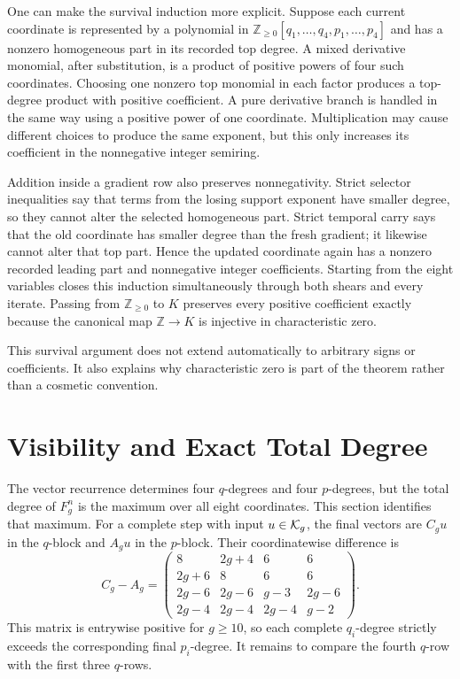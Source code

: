 \documentclass[11pt]{article}
\theoremstyle{remark}
\numberwithin{equation}{section}
\begin{document}
One can make the survival induction more explicit.  Suppose each current
coordinate is represented by a polynomial in
\(\mathbb Z_{\geq0}[q_1,\ldots,q_4,p_1,\ldots,p_4]\) and has a nonzero
homogeneous part in its recorded top degree.  A mixed derivative monomial,
after substitution, is a product of positive powers of four such
coordinates.  Choosing one nonzero top monomial in each factor produces a
top-degree product with positive coefficient.  A pure derivative branch is
handled in the same way using a positive power of one coordinate.
Multiplication may cause different choices to produce the same exponent,
but this only increases its coefficient in the nonnegative integer
semiring.

Addition inside a gradient row also preserves nonnegativity.  Strict
selector inequalities say that terms from the losing support exponent have
smaller degree, so they cannot alter the selected homogeneous part.  Strict
temporal carry says that the old coordinate has smaller degree than the
fresh gradient; it likewise cannot alter that top part.  Hence the updated
coordinate again has a nonzero recorded leading part and nonnegative
integer coefficients.  Starting from the eight variables closes this
induction simultaneously through both shears and every iterate.  Passing
from \(\mathbb Z_{\geq0}\) to \(K\) preserves every positive coefficient
exactly because the canonical map \(\mathbb Z\to K\) is injective in
characteristic zero.

This survival argument does not extend automatically to arbitrary signs or
coefficients.  It also explains why characteristic zero is part of the
theorem rather than a cosmetic convention.

\section{Visibility and Exact Total Degree}\label{sec:degree}

The vector recurrence determines four \(q\)-degrees and four \(p\)-degrees,
but the total degree of \(F_g^n\) is the maximum over all eight coordinates.
This section identifies that maximum.  For a complete step with input
\(u\in\mathcal{K}_g\), the final vectors are \(C_gu\) in the \(q\)-block and
\(A_gu\) in the \(p\)-block.  Their coordinatewise difference is
\begin{equation}\label{eq:C-minus-A}
C_g-A_g=
\begin{pmatrix}
8&2g+4&6&6\\
2g+6&8&6&6\\
2g-6&2g-6&g-3&2g-6\\
2g-4&2g-4&2g-4&g-2
\end{pmatrix}.
\end{equation}
This matrix is entrywise positive for \(g\geq10\), so each complete
\(q_i\)-degree strictly exceeds the corresponding final \(p_i\)-degree.
It remains to compare the fourth \(q\)-row with the first three \(q\)-rows.
\end{document}
